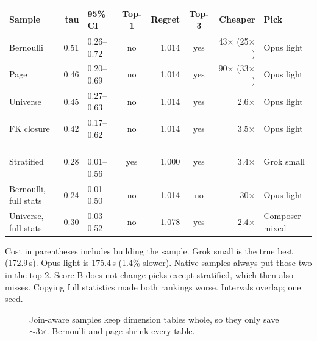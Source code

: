 \documentclass[11pt,a4paper]{article}
\begin{document}
{\footnotesize
\begin{tabularx}{\textwidth}{@{}l r l c r c r L@{}}
\toprule
Sample & tau & 95\% CI & Top-1 & Regret & Top-3 & Cheaper & Pick \\
\midrule
Bernoulli & 0.51 & 0.26--0.72 & no & 1.014 & yes & 43$\times$ (25$\times$) & Opus light \\
Page & 0.46 & 0.20--0.69 & no & 1.014 & yes & 90$\times$ (33$\times$) & Opus light \\
Universe & 0.45 & 0.27--0.63 & no & 1.014 & yes & 2.6$\times$ & Opus light \\
FK closure & 0.42 & 0.17--0.62 & no & 1.014 & yes & 3.5$\times$ & Opus light \\
Stratified & 0.28 & $-$0.01--0.56 & yes & 1.000 & yes & 3.4$\times$ & Grok small \\
Bernoulli, full stats & 0.24 & 0.01--0.50 & no & 1.014 & no & 30$\times$ & Opus light \\
Universe, full stats & 0.30 & 0.03--0.52 & no & 1.078 & yes & 2.4$\times$ & Composer mixed \\
\bottomrule
\end{tabularx}
}

{\small Cost in parentheses includes building the sample. Grok small is the true best (172.9\,s). Opus light is 175.4\,s (1.4\% slower). Native samples always put those two in the top 2. Score B does not change picks except stratified, which then also misses. Copying full statistics made both rankings worse. Intervals overlap; one seed.}

\begin{figure}[htbp]
\centering
{}
\caption{Join-aware samples keep dimension tables whole, so they only save $\sim$3$\times$. Bernoulli and page shrink every table.}
\end{figure}
\end{document}
